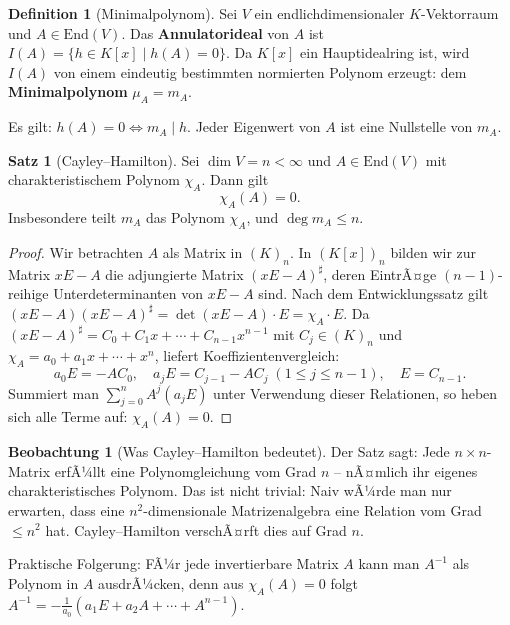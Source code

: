 ﻿\documentclass[a4paper,12pt]{report}
\theoremstyle{definition}
\newtheorem{definition}{Definition}
\newtheorem{satz}{Satz}
\newtheorem{beobachtung}{Beobachtung}
\begin{document}
\begin{definition}[Minimalpolynom]
    Sei $V$ ein endlichdimensionaler $K$-Vektorraum und $A \in \mathrm{End}(V)$.
    Das \textbf{Annulatorideal} von $A$ ist
    $I(A) = \{h \in K[x] \mid h(A) = 0\}$.
    Da $K[x]$ ein Hauptidealring ist, wird $I(A)$ von einem eindeutig
    bestimmten normierten Polynom erzeugt: dem
    \textbf{Minimalpolynom} $\mu_A = m_A$.

    Es gilt: $h(A) = 0 \Leftrightarrow m_A \mid h$.
    Jeder Eigenwert von $A$ ist eine Nullstelle von $m_A$.
\end{definition}

\begin{satz}[Cayley--Hamilton]
    Sei $\dim V = n < \infty$ und $A \in \mathrm{End}(V)$ mit
    charakteristischem Polynom $\chi_A$. Dann gilt
    \[
        \chi_A(A) = 0.
    \]
    Insbesondere teilt $m_A$ das Polynom $\chi_A$, und $\deg m_A \leq n$.
\end{satz}
\begin{proof}
    Wir betrachten $A$ als Matrix in $(K)_n$. In $(K[x])_n$ bilden wir
    zur Matrix $xE - A$ die adjungierte Matrix $(xE - A)^\sharp$,
    deren EintrÃ¤ge $(n{-}1)$-reihige Unterdeterminanten von $xE - A$ sind.
    Nach dem Entwicklungssatz gilt $(xE - A)(xE - A)^\sharp = \det(xE-A) \cdot E
    = \chi_A \cdot E$.
    Da $(xE - A)^\sharp = C_0 + C_1 x + \cdots + C_{n-1} x^{n-1}$ mit $C_j \in (K)_n$
    und $\chi_A = a_0 + a_1 x + \cdots + x^n$, liefert Koeffizientenvergleich:
    \[
        a_0 E = -AC_0, \quad a_j E = C_{j-1} - AC_j \; (1 \leq j \leq n-1), \quad E = C_{n-1}.
    \]
    Summiert man $\sum_{j=0}^n A^j(a_j E)$ unter Verwendung dieser Relationen,
    so heben sich alle Terme auf: $\chi_A(A) = 0$.
\end{proof}

\begin{beobachtung}[Was Cayley--Hamilton bedeutet]
    Der Satz sagt: Jede $n \times n$-Matrix erfÃ¼llt eine Polynomgleichung
    vom Grad $n$ -- nÃ¤mlich ihr eigenes charakteristisches Polynom.
    Das ist nicht trivial: Naiv wÃ¼rde man nur erwarten, dass eine
    $n^2$-dimensionale Matrizenalgebra eine Relation vom Grad $\leq n^2$ hat.
    Cayley--Hamilton verschÃ¤rft dies auf Grad $n$.

    Praktische Folgerung: FÃ¼r jede invertierbare Matrix $A$ kann man $A^{-1}$
    als Polynom in $A$ ausdrÃ¼cken, denn aus $\chi_A(A) = 0$ folgt
    $A^{-1} = -\frac{1}{a_0}(a_1 E + a_2 A + \cdots + A^{n-1})$.
\end{beobachtung}
\end{document}
